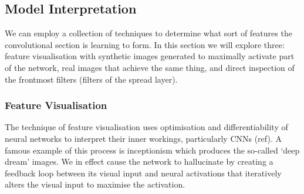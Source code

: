 \subsection{Model Interpretation}
We can employ a collection of techniques to determine what sort of features the convolutional section is learning to form.
In this section we will explore three: feature visualisation with synthetic images generated to maximally activate part of the network, real images that achieve the same thing, and direct inspection of the frontmost filters (filters of the spread layer).



\subsubsection{Feature Visualisation}
The technique of feature visualisation uses optimisation and differentiability of neural networks to interpret their inner workings, particularly CNNs (ref). A famous example of this process is inceptionism which produces the so-called `deep dream' images. We in effect cause the network to hallucinate by creating a feedback loop between its visual input and neural activations that iteratively alters the visual input to maximise the activation.

